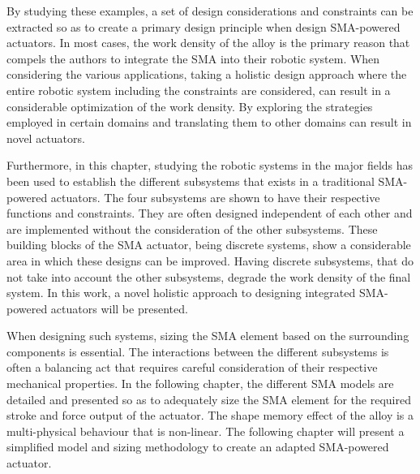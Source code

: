 By studying these examples, a set of design considerations and constraints can be extracted so as to create a primary design principle when design SMA-powered actuators. In most cases, the work density of the alloy is the primary reason that compels the authors to integrate the SMA into their robotic system. When considering the various applications, taking a holistic design approach where the entire robotic system including the constraints are considered, can result in a considerable optimization of the work density. By exploring the strategies employed in certain domains and translating them to other domains can result in novel actuators.

Furthermore, in this chapter, studying the robotic systems in the major fields has been used to establish the different subsystems that exists in a traditional SMA-powered actuators. The four subsystems are shown to have their respective functions and constraints. They are often designed independent of each other and are implemented without the consideration of the other subsystems. These building blocks of the SMA actuator, being discrete systems, show a considerable area in which these designs can be improved. Having discrete subsystems, that do not take into account the other subsystems, degrade the work density of the final system. In this work, a novel holistic approach to designing integrated SMA-powered actuators will be presented.

When designing such systems, sizing the SMA element based on the surrounding components is essential. The interactions between the different subsystems is often a balancing act that requires careful consideration of their respective mechanical properties. In the following chapter, the different SMA models are detailed and presented so as to adequately size the SMA element for the required stroke and force output of the actuator. The shape memory effect of the alloy is a multi-physical behaviour that is non-linear. The following chapter will present a simplified model and sizing methodology to create an adapted SMA-powered actuator.
